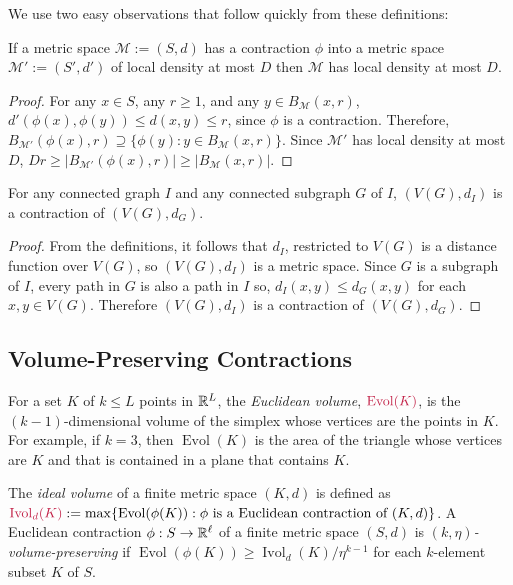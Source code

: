 \documentclass{patmorin}
\makeatletter
\renewcommand{\ge}{\geqslant}
\renewcommand{\le}{\leqslant}
\newcommand{\defin}[1]{\emph{\textcolor{brightmaroon}{#1}}}
\def\mathcolor#1#{\@mathcolor{#1}}
\def\@mathcolor#1#2#3{%
  \protect\leavevmode
  \begingroup
    \color#1{#2}#3%
  \endgroup
}
\newcommand{\mathdefin}[1]{\mathcolor{brightmaroon}{#1}}
\DeclareMathOperator{\evol}{Evol}
\DeclareMathOperator{\ivol}{Ivol}
\makeatother
\begin{document}
We use two easy observations that follow quickly from these definitions:

\begin{obs}\label{contraction_increases_density}
  If a metric space $\mathcal{M}:=(S,d)$ has a contraction $\phi$ into a metric space $\mathcal{M}':=(S',d')$ of local density at most $D$ then $\mathcal{M}$ has local density at most $D$.
\end{obs}

\begin{proof}
  For any $x\in S$, any $r\ge 1$, and any $y\in B_\mathcal{M}(x,r)$, $d'(\phi(x),\phi(y))\le d(x,y)\le r$, since $\phi$ is a contraction.  Therefore, $B_{\mathcal{M'}}(\phi(x),r)\supseteq\{\phi(y):y\in B_{\mathcal{M}}(x,r)\}$.  Since $\mathcal{M'}$ has local density at most $D$,  $Dr \ge |B_\mathcal{M'}(\phi(x),r)|\ge |B_{\mathcal{M}}(x,r)|$.
\end{proof}

\begin{obs}\label{supergraph_contraction}
  For any connected graph $I$ and any connected subgraph $G$ of $I$, $(V(G),d_I)$ is a contraction of $(V(G),d_G)$.
\end{obs}

\begin{proof}
  From the definitions, it follows that $d_I$, restricted to $V(G)$ is a distance function over $V(G)$, so $(V(G),d_I)$ is a metric space.  Since $G$ is a subgraph of $I$, every path in $G$ is also a path in $I$ so, $d_I(x,y)\le d_G(x,y)$ for each $x,y\in V(G)$.  Therefore $(V(G),d_I)$ is a contraction of $(V(G),d_G)$.
\end{proof}


\subsection{Volume-Preserving Contractions}
\label{contractions_section}

For a set $K$ of $k\le L$ points in $\mathbb{R}^L$, the \defin{Euclidean volume}, $\mathdefin{\evol(K)}$, is the $(k-1)$-dimensional volume of the simplex whose vertices are the points in $K$.  For example, if $k=3$, then $\evol(K)$ is the area of the triangle whose vertices are $K$ and that is contained in a plane that contains $K$.

The \defin{ideal volume} of a finite metric space $(K,d)$ is defined as $\mathdefin{\ivol_d(K)}:=\max\{\evol(\phi(K)):\text{$\phi$ is a Euclidean contraction of $(K,d)$}\}$.  A Euclidean contraction $\phi:S\to\mathbb{R}^{\ell}$ of a finite metric space $(S,d)$ is \defin{$(k,\eta)$-volume-preserving} if $\evol(\phi(K))\ge \ivol_d(K)/\eta^{k-1}$ for each $k$-element subset $K$ of $S$.
\end{document}
